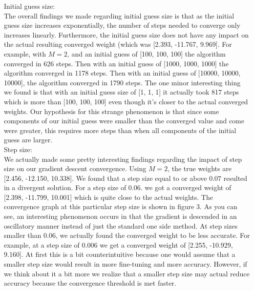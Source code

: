 \documentclass{article}
\begin{document}
Initial guess size:\\
The overall findings we made regarding initial guess size is that as the initial guess size increases exponentially, the number of steps needed to converge only increases linearly. Furthermore, the initial guess size does not have any impact on the actual resulting converged weight (which was  [2.393, -11.767, 9.969]. For example, with $M = 2$, and an initial guess of [100, 100, 100] the algorithm converged in 626 steps. Then with an initial guess of [1000, 1000, 1000] the algorithm converged in 1178 steps. Then with an initial guess of [10000, 10000, 10000], the algorithm converged in 1790 steps. The one minor interesting thing we found is that with an initial guess size of [1, 1, 1]  it actually took 817 steps which is more than [100, 100, 100] even though it's closer to the actual converged weights. Our hypothesis for this strange phenomenon is that since some components of our initial guess were smaller than the converged value and come were greater, this requires more steps than when all components of the initial guess are larger.\\

Step size: \\
We actually made some pretty interesting findings regarding the impact of step size on our gradient descent convergence. Using $M = 2$, the true weights are [2.456, -12.150, 10.338]. We found that a step size equal to or above $0.07$ resulted in a divergent solution. For a step size of $0.06$. we got a converged weight of [2.398, -11.799, 10.001] which is quite close to the actual weights. The convergence graph at this particular step size is shown in figure 3. As you can see, an interesting phenomenon occurs in that the gradient is descended in an oscillatory manner instead of just the standard one side method. At step sizes smaller than $0.06$, we actually found the converged weight to be less accurate. For example, at a step size of $0.006$ we get a converged weight of [2.255, -10.929, 9.160]. At first this is a bit counterintuitive because one would assume that a smaller step size would result in more fine-tuning and more accuracy. However, if we think about it a bit more we realize that a smaller step size may actual reduce accuracy because the convergence threshold is met faster.\\
\end{document}
